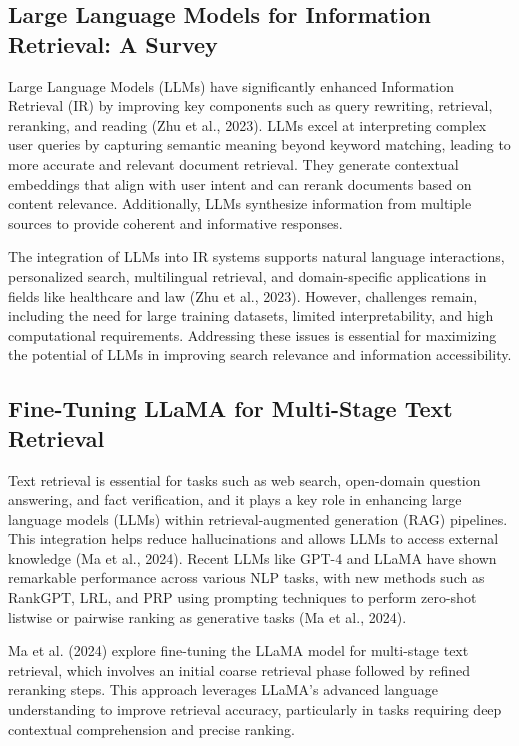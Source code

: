 \subsection{Large Language Models for Information Retrieval: A Survey}

Large Language Models (LLMs) have significantly enhanced Information Retrieval (IR) by improving key components such as query rewriting, retrieval, reranking, and reading (Zhu et al., 2023). LLMs excel at interpreting complex user queries by capturing semantic meaning beyond keyword matching, leading to more accurate and relevant document retrieval. They generate contextual embeddings that align with user intent and can rerank documents based on content relevance. Additionally, LLMs synthesize information from multiple sources to provide coherent and informative responses.

The integration of LLMs into IR systems supports natural language interactions, personalized search, multilingual retrieval, and domain-specific applications in fields like healthcare and law (Zhu et al., 2023). However, challenges remain, including the need for large training datasets, limited interpretability, and high computational requirements. Addressing these issues is essential for maximizing the potential of LLMs in improving search relevance and information accessibility.

\subsection{Fine-Tuning LLaMA for Multi-Stage Text Retrieval}

Text retrieval is essential for tasks such as web search, open-domain question answering, and fact verification, and it plays a key role in enhancing large language models (LLMs) within retrieval-augmented generation (RAG) pipelines. This integration helps reduce hallucinations and allows LLMs to access external knowledge (Ma et al., 2024). Recent LLMs like GPT-4 and LLaMA have shown remarkable performance across various NLP tasks, with new methods such as RankGPT, LRL, and PRP using prompting techniques to perform zero-shot listwise or pairwise ranking as generative tasks (Ma et al., 2024).

Ma et al. (2024) explore fine-tuning the LLaMA model for multi-stage text retrieval, which involves an initial coarse retrieval phase followed by refined reranking steps. This approach leverages LLaMA’s advanced language understanding to improve retrieval accuracy, particularly in tasks requiring deep contextual comprehension and precise ranking.


